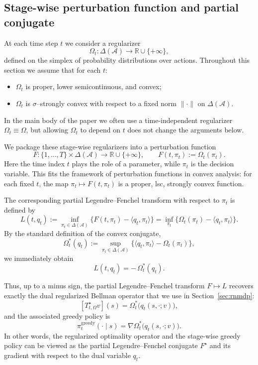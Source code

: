 \documentclass{article}
\theoremstyle{plain}
\theoremstyle{definition}
\theoremstyle{remark}
\newcommand{\1}{\mathbbm{1}}
\begin{document}
\subsection{Stage-wise perturbation function and partial conjugate}

At each time step $t$ we consider a regularizer
\[
\Omega_t : \Delta(\mathcal{A}) \to \mathbb{R}\cup\{+\infty\},
\]
defined on the simplex of probability distributions over actions. Throughout this section we assume that for each $t$:
\begin{itemize}
  \item $\Omega_t$ is proper, lower semicontinuous, and convex;
  \item $\Omega_t$ is $\sigma$--strongly convex with respect to a fixed norm $\|\cdot\|$ on $\Delta(\mathcal{A})$.
\end{itemize}
In the main body of the paper we often use a time-independent regularizer $\Omega_t \equiv \Omega$, but allowing $\Omega_t$ to depend on $t$ does not change the arguments below.

We package these stage-wise regularizers into a perturbation function
\[
F : \{1,\dots,T\} \times \Delta(\mathcal{A}) \to \mathbb{R}\cup\{+\infty\},\qquad
F(t,\pi_t) := \Omega_t(\pi_t).
\]
Here the time index $t$ plays the role of a parameter, while $\pi_t$ is the decision variable. This fits the framework of perturbation functions in convex analysis: for each fixed $t$, the map $\pi_t \mapsto F(t,\pi_t)$ is a proper, lsc, strongly convex function.

The corresponding partial Legendre--Fenchel transform with respect to $\pi_t$ is defined by
\[
L(t,q_t)
:= \inf_{\pi_t \in \Delta(\mathcal{A})}
\big\{F(t,\pi_t) - \langle q_t, \pi_t \rangle\big\}
= \inf_{\pi_t} \big\{ \Omega_t(\pi_t) - \langle q_t, \pi_t \rangle\big\}.
\]
By the standard definition of the convex conjugate,
\[
\Omega_t^*(q_t)
:= \sup_{\pi_t \in \Delta(\mathcal{A})}
\big\{\langle q_t,\pi_t\rangle - \Omega_t(\pi_t)\big\},
\]
we immediately obtain
\[
L(t,q_t) = -\,\Omega_t^*(q_t).
\]

Thus, up to a minus sign, the partial Legendre--Fenchel transform $F \mapsto L$ recovers exactly the dual regularized Bellman operator that we use in Section~\ref{sec:rnmdp}:
\[
[T_{t,\Omega}^\star v](s)
= \Omega_t^*\big(q_t(s,\cdot; v)\big),
\]
and the associated greedy policy is
\[
\pi_t^\mathrm{greedy}(\cdot \mid s)
= \nabla \Omega_t^*\big(q_t(s,\cdot; v)\big).
\]
In other words, the regularized optimality operator and the stage-wise greedy policy can be viewed as the partial Legendre--Fenchel conjugate $F^\star$ and its gradient with respect to the dual variable $q_t$.
\end{document}
